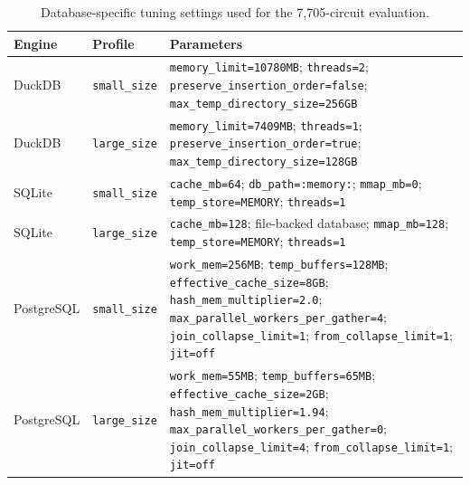 \begin{table}[t]
  \centering
  \caption{Database-specific tuning settings used for the 7{,}705-circuit evaluation. 
  }
  \label{tab:finetuned-rdbms-profiles}
  \footnotesize
  \setlength{\tabcolsep}{4pt}
  \begin{tabularx}{\textwidth}{@{}llX@{}}
    \toprule
    \textbf{Engine} & \textbf{Profile} & \textbf{Parameters} \\
    \midrule
    DuckDB
      & \texttt{small\_size}
      & \texttt{memory\_limit=10780MB}; \texttt{threads=2};
        \texttt{preserve\_insertion\_order=false};
        \texttt{max\_temp\_directory\_size=256GB} \\
    DuckDB
      & \texttt{large\_size}
      & \texttt{memory\_limit=7409MB}; \texttt{threads=1};
        \texttt{preserve\_insertion\_order=true};
        \texttt{max\_temp\_directory\_size=128GB} \\
    SQLite
      & \texttt{small\_size}
      & \texttt{cache\_mb=64}; \texttt{db\_path=:memory:};
        \texttt{mmap\_mb=0}; \texttt{temp\_store=MEMORY};
        \texttt{threads=1} \\
    SQLite
      & \texttt{large\_size}
      & \texttt{cache\_mb=128}; file-backed database;
        \texttt{mmap\_mb=128}; \texttt{temp\_store=MEMORY};
        \texttt{threads=1} \\
    PostgreSQL
      & \texttt{small\_size}
      & \texttt{work\_mem=256MB}; \texttt{temp\_buffers=128MB};
        \texttt{effective\_cache\_size=8GB};
        \texttt{hash\_mem\_multiplier=2.0};
        \texttt{max\_parallel\_workers\_per\_gather=4};
        \texttt{join\_collapse\_limit=1}; \texttt{from\_collapse\_limit=1};
        \texttt{jit=off} \\
    PostgreSQL
      & \texttt{large\_size}
      & \texttt{work\_mem=55MB}; \texttt{temp\_buffers=65MB};
        \texttt{effective\_cache\_size=2GB};
        \texttt{hash\_mem\_multiplier=1.94};
        \texttt{max\_parallel\_workers\_per\_gather=0};
        \texttt{join\_collapse\_limit=4}; \texttt{from\_collapse\_limit=1};
        \texttt{jit=off} \\
    \bottomrule
  \end{tabularx}
\end{table}


